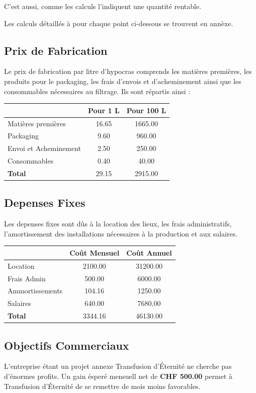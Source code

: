 \documentclass[10pt,a4paper]{article}
\newcommand{\tde}{Transfusion d'Éternité}
\begin{document}
C'est aussi, comme les calculs l'indiquent une quantité rentable.

Les calculs détaillés à pour chaque point ci-dessous se trouvent en annèxe.

\subsection{Prix de Fabrication}
Le prix de fabrication par litre d'hypocras comprends les matières premières, les produits pour le packaging, les frais d'envois et d'acheminement ainsi que les consommables nécessaires au filtrage.
Ils sont répartis ainsi :

\vspace{0.5cm}
\begin{tabular}{|l|S[table-format=4.2]|S[table-format=4.2]|}
\hline
& \textbf{Pour 1 L} & \textbf{Pour 100 L} \\\hline
Matières premières & 16.65 & 1665.00\\ 
Packaging & 9.60 & 960.00\\ 
Envoi et Acheminement & 2.50 & 250.00 \\
Consommables & 0.40 & 40.00\\\hline
\textbf{Total} & 29.15 & 2915.00\\\hline
\end{tabular}


\subsection{Depenses Fixes}
Les depenses fixes sont dûs à la location des lieux, les frais administratifs, l'amortissement des installations nécessaires à la production et aux salaires.

\vspace{0.5cm}
\begin{tabular}{|l|S[table-format=3.2]|S[table-format=3.2]|}
\hline
& \textbf{Coût Mensuel} & \textbf{Coût Annuel} \\\hline
Location & 2100.00 & 31200.00\\
Frais Admin & 500.00 & 6000.00 \\
Ammortissements & 104.16 & 1250.00\\
Salaires & 640.00 & 7680.00 \\\hline
\textbf{Total} & 3344.16 & 46130.00 \\\hline
\end{tabular}

\subsection{Objectifs Commerciaux}
L'entreprise étant un projet annexe \tde{} ne cherche pas d'énormes profits.
Un gain ésperé mensuell net de \textbf{CHF 500.00} permet à \tde{} de se remettre de mois moins favorables.
\end{document}
